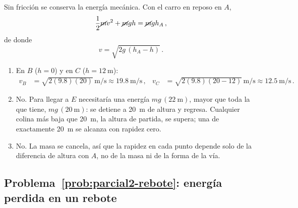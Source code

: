 Sin fricción se conserva la energía mecánica. Con el carro en reposo en $A$,
\begin{equation*}
    \frac{1}{2}\cancel{m}v^2 + \cancel{m}gh = \cancel{m}gh_A\,,
\end{equation*}
de donde
\begin{equation}
    v = \sqrt{2g\,(h_A - h)}\,.
\end{equation}
\begin{enumerate}[label=\alph*)]
    \item En $B$ ($h = 0$) y en $C$ ($h = \SI{12}{\meter}$):
    \begin{align}
        v_B &= \sqrt{2(9.8)(20)}\,\si{\meter\per\second}
            \approx \SI{19.8}{\meter\per\second}\,, &
        v_C &= \sqrt{2(9.8)(20 - 12)}\,\si{\meter\per\second}
            \approx \SI{12.5}{\meter\per\second}\,.
    \end{align}
    \item No. Para llegar a $E$ necesitaría una energía
    $mg\,(\SI{22}{\meter})$, mayor que toda la que tiene,
    $mg\,(\SI{20}{\meter})$: se detiene a \SI{20}{\meter} de altura y
    regresa. Cualquier colina más baja que \SI{20}{\meter}, la altura de
    partida, se supera; una de exactamente \SI{20}{\meter} se alcanza con
    rapidez cero.
    \item No. La masa se cancela, así que la rapidez en cada punto depende
    solo de la diferencia de altura con $A$, no de la masa ni de la forma de
    la vía.
\end{enumerate}

\subsection*{Problema~\ref{prob:parcial2-rebote}: energía perdida en un rebote}
\label{sol:parcial2-rebote}

